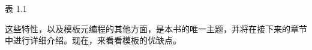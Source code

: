 \begin{center}
表 1.1
\end{center}

这些特性，以及模板元编程的其他方面，是本书的唯一主题，并将在接下来的章节中进行详细介绍。现在，来看看模板的优缺点。






















